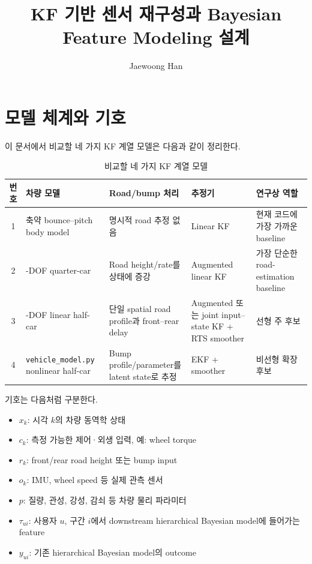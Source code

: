 \documentclass[letterpaper,10pt,journal,twocolumn]{ieeeconf}
\title{KF 기반 센서 재구성과 Bayesian Feature Modeling 설계}
\author{Jaewoong Han}
\begin{document}
\maketitle

\section{모델 체계와 기호}

이 문서에서 비교할 네 가지 KF 계열 모델은 다음과 같이 정리한다.

\begin{table}[t]
\caption{비교할 네 가지 KF 계열 모델}
\label{tab:model-overview}
\centering
\scriptsize
\setlength{\tabcolsep}{3.5pt}
\renewcommand{\arraystretch}{1.18}
\begin{tabular}{c
                >{\raggedright\arraybackslash}p{}
                >{\raggedright\arraybackslash}p{}
                >{\raggedright\arraybackslash}p{}
                >{\raggedright\arraybackslash}p{}}
\toprule
번호 & 차량 모델 & Road/bump 처리 & 추정기 & 연구상 역할 \\
\midrule
1 & 축약 bounce--pitch body model
  & 명시적 road 추정 없음
  & Linear KF
  & 현재 코드에 가장 가까운 baseline \\
2 & 2-DOF quarter-car
  & Road height/rate를 상태에 증강
  & Augmented linear KF
  & 가장 단순한 road-estimation baseline \\
3 & 4-DOF linear half-car
  & 단일 spatial road profile과 front--rear delay
  & Augmented 또는 joint input--state KF + RTS smoother
  & 선형 주 후보 \\
4 & \texttt{vehicle\_model.py} nonlinear half-car
  & Bump profile/parameter를 latent state로 추정
  & EKF + smoother
  & 비선형 확장 후보 \\
\bottomrule
\end{tabular}
\end{table}

기호는 다음처럼 구분한다.

\begin{itemize}

\item
  \(x_k\): 시각 \(k\)의 차량 동역학 상태
\item
  \(c_k\): 측정 가능한 제어·외생 입력, 예: wheel torque
\item
  \(r_k\): front/rear road height 또는 bump input
\item
  \(o_k\): IMU, wheel speed 등 실제 관측 센서
\item
  \(p\): 질량, 관성, 강성, 감쇠 등 차량 물리 파라미터
\item
  \(\tau_{ui}\): 사용자 \(u\), 구간 \(i\)에서 downstream hierarchical Bayesian model에 들어가는 feature
\item
  \(y_{ui}\): 기존 hierarchical Bayesian model의 outcome
\end{itemize}
\end{document}
